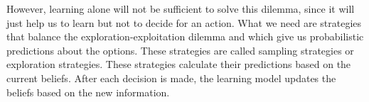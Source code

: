 However, learning alone will not be sufficient to solve this dilemma, since it will just help us to learn but not to decide for an action. What we need are strategies that balance the exploration-exploitation dilemma and which give us probabilistic predictions about the options. These strategies are called sampling strategies or exploration strategies. These strategies calculate their predictions based on the current beliefs. After each decision is made, the learning model updates the beliefs based on the new information. 



